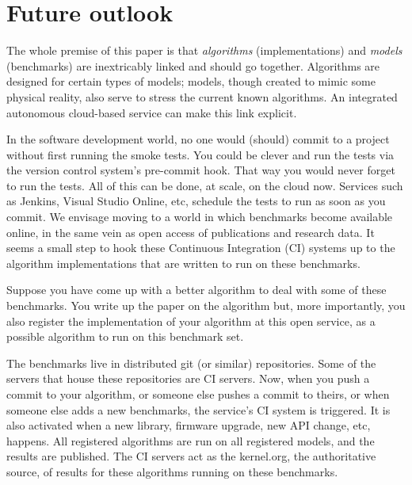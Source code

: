 \documentclass[conference]{IEEEtran}
\begin{document}
\section{Future outlook}




The whole premise of this paper is that {\emph{algorithms}}
(implementations) and {\emph{models}} (benchmarks) are inextricably
linked and should go together. Algorithms are designed for certain
types of models; models, though created to mimic some physical
reality, also serve to stress the current known algorithms. An
integrated autonomous cloud-based service can make this link explicit.

In the software development world, no one would (should) commit to a
project without first running the smoke tests. You could be clever and
run the tests via the version control system's pre-commit hook. That
way you would never forget to run the tests. All of this can be done,
at scale, on the cloud now. Services such as Jenkins, Visual Studio
Online, etc, schedule the tests to run as soon as you commit. We
envisage moving to a world in which benchmarks become available
online, in the same vein as open access of publications and research
data. It seems a small step to hook these Continuous Integration (CI)
systems up to the algorithm implementations that are written to run on
these benchmarks.

Suppose you have come up with a better algorithm to deal with some of
these benchmarks. You write up the paper on the algorithm but, more
importantly, you also register the implementation of your algorithm at
this open service, as a possible algorithm to run on this benchmark
set.

The benchmarks live in distributed git (or similar) repositories. Some
of the servers that house these repositories are CI servers. Now, when
you push a commit to your algorithm, or someone else pushes a commit
to theirs, or when someone else adds a new benchmarks, the service's
CI system is triggered. It is also activated when a new library,
firmware upgrade, new API change, etc, happens. All registered
algorithms are run on all registered models, and the results are
published. The CI servers act as the kernel.org, the authoritative
source, of results for these algorithms running on these benchmarks.
\end{document}
